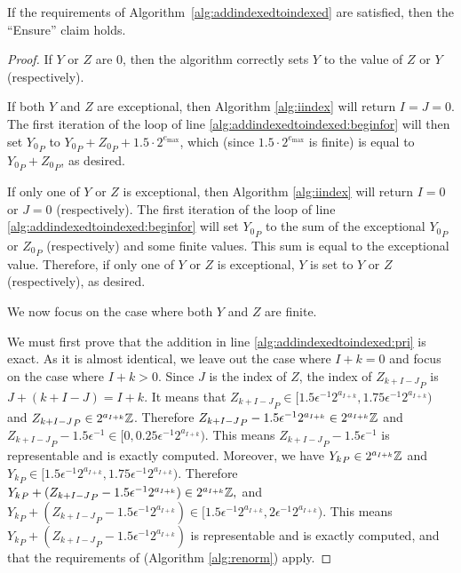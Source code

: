     \begin{thm}
      If the requirements of Algorithm~\ref{alg:addindexedtoindexed} are satisfied, then the ``Ensure'' claim holds.
      \label{thm:addindexedtoindexed}
    \end{thm}
    \begin{proof}
      If $Y$ or $Z$ are 0, then the algorithm correctly sets $Y$ to the value of $Z$ or $Y$ (respectively).

      If both $Y$ and $Z$ are exceptional, then Algorithm \ref{alg:iindex} will return $I = J = 0$. The first iteration of the loop of line \ref{alg:addindexedtoindexed:beginfor} will then set ${Y_{0}}_P$ to ${Y_{0}}_P + {Z_{0}}_P + 1.5 \cdot 2^{e_{\max}}$, which (since $1.5 \cdot 2^{e_{\max}}$ is finite) is equal to ${Y_{0}}_P + {Z_{0}}_P$, as desired.

      If only one of $Y$ or $Z$ is exceptional, then Algorithm \ref{alg:iindex} will return $I = 0$ or $J = 0$ (respectively). The first iteration of the loop of line \ref{alg:addindexedtoindexed:beginfor} will set ${Y_{0}}_P$ to the sum of the exceptional ${Y_0}_P$ or ${Z_0}_P$ (respectively) and some finite values. This sum is equal to the exceptional value. Therefore, if only one of $Y$ or $Z$ is exceptional, $Y$ is set to $Y$ or $Z$ (respectively), as desired.

      We now focus on the case where both $Y$ and $Z$ are finite.

      We must first prove that the addition in line \ref{alg:addindexedtoindexed:pri} is exact. As it is almost identical, we leave out the case where $I + k = 0$ and focus on the case where $I + k > 0$.
      Since $J$ is the index of $Z$, the index of ${Z_{k + I-J}}_P$ is
      $J + (k + I -J) = I + k$. It means that
      \(
        {Z_{k + I-J}}_P \in [1.5 \epsilon^{-1} 2^{a_{I+k}}, 1.75 \epsilon^{-1} 2^{a_{I+k}})
      \)
      and ${Z_{k + I-J}}_P \in 2^{a_{I+k}} \mathbb{Z}$.
      Therefore ${Z_{k + I-J}}_P - 1.5 \epsilon^{-1}  2^{a_{I+k}} \in 2^{a_{I+k}} \mathbb{Z}$
      and ${Z_{k + I-J}}_P - 1.5 \epsilon^{-1} \in [0, 0.25 \epsilon^{-1} 2^{a_{I+k}})$.
      This means ${Z_{k + I-J}}_P - 1.5 \epsilon^{-1}$ is representable and is
      exactly computed.
      Moreover, we have ${Y_{k}}_P \in 2^{a_{I+k}} \mathbb{Z}$ and
      \(
        {Y_{k}}_P \in [1.5 \epsilon^{-1} 2^{a_{I+k}}, 1.75 \epsilon^{-1} 2^{a_{I+k}})
      \).
      Therefore
      \(
        {Y_{k}}_P + ({Z_{k + I-J}}_P - 1.5 \epsilon^{-1}  2^{a_{I+k}})
          \in 2^{a_{I+k}} \mathbb{Z},
      \)
      and
      \(
        {Y_{k}}_P + ({Z_{k + I-J}}_P - 1.5 \epsilon^{-1}  2^{a_{I+k}})
          \in [1.5 \epsilon^{-1} 2^{a_{I+k}}, 2 \epsilon^{-1} 2^{a_{I+k}})
      \).
      This means ${Y_{k}}_P + ({Z_{k + I-J}}_P - 1.5 \epsilon^{-1}  2^{a_{I+k}})$
      is representable and is exactly computed, and that the requirements of  (Algorithm \ref{alg:renorm}) apply.


\end{proof}

